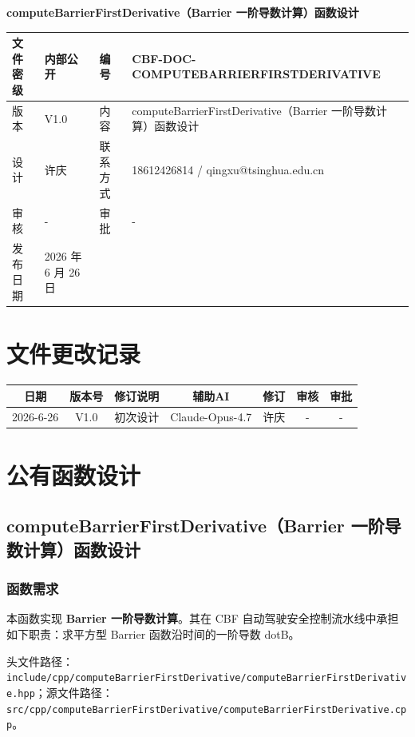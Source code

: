 \documentclass[a4paper,10pt]{article}
\begin{document}
\begin{titlepage}
    \centering
    {\Huge\textbf{computeBarrierFirstDerivative（Barrier 一阶导数计算）函数设计}\par}
    \vspace{1.5cm}
    \renewcommand{\arraystretch}{1.5}
    \begin{tabular}{|l|l|l|l|}
        \hline
        文件密级 & 内部公开 & 编号 & CBF-DOC-COMPUTEBARRIERFIRSTDERIVATIVE \\ \hline
        版本 & V1.0 & 内容 & computeBarrierFirstDerivative（Barrier 一阶导数计算）函数设计 \\ \hline
        设计 & 许庆 & 联系方式 & 18612426814 / qingxu@tsinghua.edu.cn \\ \hline
        审核 & - & 审批 & - \\ \hline
        发布日期 & 2026 年 6 月 26 日 & & \\ \hline
    \end{tabular}
    \vspace{1.5cm}
    \section*{文件更改记录}
    \begin{longtable}{|c|c|p{4cm}|c|c|c|c|}
        \hline
        日期 & 版本号 & 修订说明 & 辅助AI & 修订 & 审核 & 审批 \\ \hline
        2026-6-26 & V1.0 & 初次设计 & Claude-Opus-4.7 & 许庆 & - & - \\ \hline
    \end{longtable}
\end{titlepage}
\tableofcontents
\newpage
\section{公有函数设计}
\subsection{computeBarrierFirstDerivative（Barrier 一阶导数计算）函数设计}
\subsubsection{函数需求}
\par 本函数实现 \textbf{Barrier 一阶导数计算}。其在 CBF 自动驾驶安全控制流水线中承担如下职责：求平方型 Barrier 函数沿时间的一阶导数 dotB。
\par 头文件路径：\texttt{include/cpp/computeBarrierFirstDerivative/computeBarrierFirstDerivative.hpp}；源文件路径：\texttt{src/cpp/computeBarrierFirstDerivative/computeBarrierFirstDerivative.cpp}。
\end{document}
